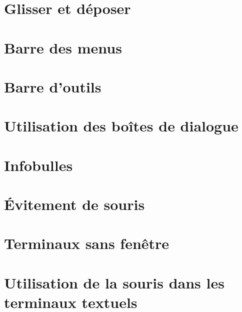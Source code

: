 \section{Glisser et déposer}\label{chap18sec12}
\section{Barre des menus}\label{chap18sec13}
\section{Barre d'outils}\label{chap18sec14}
\section{Utilisation des boîtes de dialogue}\label{chap18sec15}
\section{Infobulles}\label{chap18sec16}
\section{\'Evitement de souris}\label{chap18sec17}
\section{Terminaux sans fenêtre}\label{chap18sec18}
\section{Utilisation de la souris dans les terminaux
  textuels}\label{chap18sec19} 
